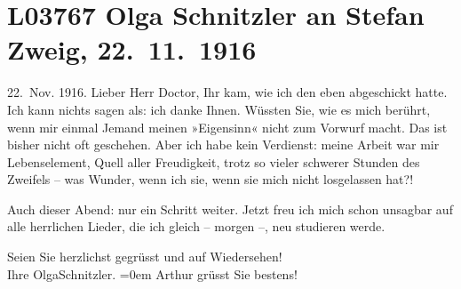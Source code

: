 

\section[Olga Schnitzler an Stefan Zweig, 22. 11. 1916]{L03767 Olga Schnitzler an Stefan Zweig, 22. 11. 1916}
\nopagebreak{}
\rehead{ }\normalsize\beginnumbering{}
\toendnotes[C]{\smallbreak\pagebreak[2]}
\toendnotes[C]{\smallbreak}
\toendnotes[C]{\smallbreak}
\pstart
           \raggedleft{}{\pb}22. Nov. 1916.\pend
           \vspace{0.5em}
\pstart
           Lieber Herr Doctor, Ihr \label{K_L03767-1v}\label{K_L03767-1} kam, wie ich den \label{K_L03767-2v}\label{K_L03767-2} eben
               abgeschickt hatte. Ich kann nichts sagen als: ich danke Ihnen. Wüssten Sie, wie es
               mich berührt, wenn mir einmal Jemand meinen »Eigensinn« nicht zum Vorwurf macht. Das
               ist bisher nicht oft geschehen. Aber ich habe {\pb}kein
               Verdienst: meine Arbeit war mir Lebenselement, Quell aller Freudigkeit, trotz so
               vieler schwerer Stunden des Zweifels – was Wunder, wenn ich sie, wenn sie mich nicht
               losgelassen hat?!\pend
           
\pstart
           Auch dieser Abend: nur ein Schritt weiter. Jetzt freu ich mich schon unsagbar auf
               alle herrlichen Lieder, die ich gleich – morgen –, neu studieren werde.\pend
           
\pstart
           Seien Sie herzlichst gegrüsst und auf Wiedersehen!{\\[\baselineskip]}
               Ihre
                  \spacefill\mbox{OlgaSchnitzler.}\pend
           \leftskip=0em{}
\pstart
           \noindent{}Arthur grüsst Sie bestens!\pend
           \endnumbering{}  \newcommand{\dateiname}{L03767}\newcommand{\titel}{Olga Schnitzler an Stefan Zweig, 22. 11. 1916}\newcommand{\editorInnen}{Selma Jahnke und Martin Anton Müller}
